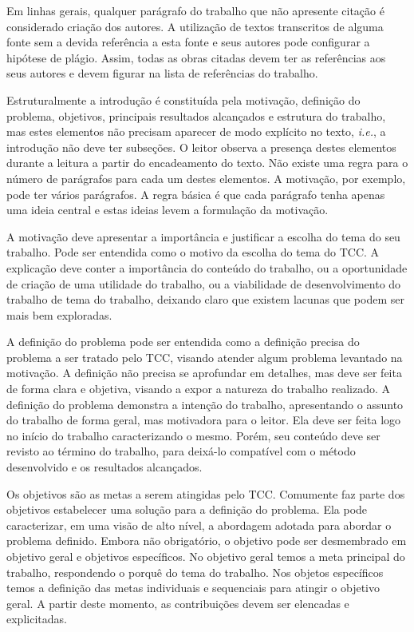\documentclass[12pt]{tcc}
\begin{document}
Em linhas gerais, qualquer parágrafo do trabalho que não apresente citação é considerado criação dos autores. A utilização de textos transcritos de alguma fonte sem a devida referência a esta fonte e seus autores pode configurar a hipótese de plágio. Assim, todas as obras citadas devem ter as referências aos seus autores e devem figurar na lista de referências do trabalho.

Estruturalmente a introdução é constituída pela motivação, definição do problema, objetivos, principais resultados alcançados e estrutura do trabalho, mas estes elementos não precisam aparecer de modo explícito no texto, \emph{i.e.}, a introdução não deve ter subseções. O leitor observa a presença destes elementos durante a leitura a partir do encadeamento do texto. Não existe uma regra para o número de parágrafos para cada um destes elementos. A motivação, por exemplo, pode ter vários parágrafos. A regra básica é que cada parágrafo tenha apenas uma ideia central e estas ideias levem a formulação da motivação. 

A motivação deve apresentar a importância e justificar a escolha do tema do seu trabalho. Pode ser entendida como o motivo da escolha do tema do \acrshort{TCC}. A explicação deve conter a importância do conteúdo do trabalho, ou a oportunidade de criação de uma utilidade do trabalho, ou a viabilidade de desenvolvimento do trabalho de tema do trabalho, deixando claro que existem lacunas que podem ser mais bem exploradas. 

A definição do problema pode ser entendida como a definição precisa do problema a ser tratado pelo \acrshort{TCC}, visando atender algum problema levantado na motivação. A definição não precisa se aprofundar em detalhes, mas deve ser feita de forma clara e objetiva, visando a expor a natureza do trabalho realizado. A definição do problema demonstra a intenção do trabalho, apresentando o assunto do trabalho de forma geral, mas motivadora para o leitor. Ela deve ser feita logo no início do trabalho caracterizando o mesmo. Porém, seu conteúdo deve ser revisto ao término do trabalho, para deixá-lo compatível com o método desenvolvido e os resultados alcançados.

Os objetivos são as metas a serem atingidas pelo \acrshort{TCC}. Comumente faz parte dos objetivos estabelecer uma solução para a definição do problema. Ela pode caracterizar, em uma visão de alto nível, a abordagem adotada para abordar o problema definido. Embora não obrigatório, o objetivo pode ser desmembrado em objetivo geral e objetivos específicos. No objetivo geral temos a meta principal do trabalho, respondendo o porquê do tema do trabalho. Nos objetos específicos temos a definição das metas individuais e sequenciais para atingir o objetivo geral. A partir deste momento, as contribuições devem ser elencadas e explicitadas.
\end{document}
